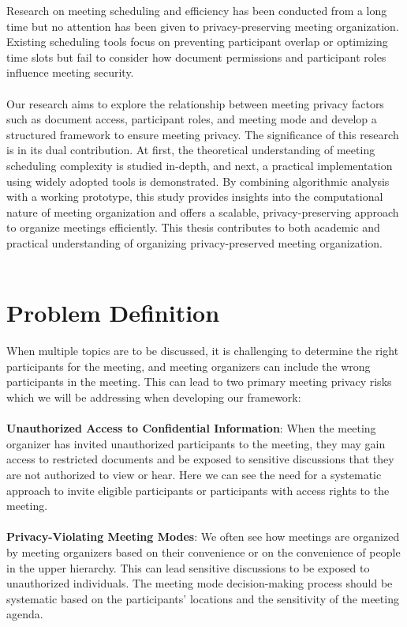 Research on meeting scheduling and efficiency has been conducted from a long time but no attention has been given to privacy-preserving meeting organization. Existing scheduling tools focus on preventing participant overlap or optimizing time slots but fail to consider how document permissions and participant roles influence meeting security.\\ \\
Our research aims to explore the relationship between meeting privacy factors such as document access, participant roles, and meeting mode and develop a structured framework to ensure meeting privacy.
The significance of this research is in its dual contribution. At first, the theoretical understanding of meeting scheduling complexity is studied in-depth, and next, a practical implementation using widely adopted tools is demonstrated. By combining algorithmic analysis with a working prototype, this study provides insights into the computational nature of meeting organization and offers a scalable, privacy-preserving approach to organize meetings efficiently. This thesis contributes to both academic and practical understanding of organizing privacy-preserved meeting organization.\\ \\

\section{Problem Definition}
When multiple topics are to be discussed, it is challenging to determine the right participants for the meeting, and meeting organizers can include the wrong participants in the meeting. This can lead to two primary meeting privacy risks which we will be addressing when developing our framework:
\\
\\
\textbf{Unauthorized Access to Confidential Information}: When the meeting organizer has invited unauthorized participants to the meeting, they may gain access to restricted documents and be exposed to sensitive discussions that they are not authorized to view or hear. Here we can see the need for a systematic approach to invite eligible participants or participants with access rights to the meeting.
\\
\\
\textbf{Privacy-Violating Meeting Modes}: We often see how meetings are organized by meeting organizers based on their convenience or on the convenience of people in the upper hierarchy. This can lead sensitive discussions to be exposed to unauthorized individuals. The meeting mode decision-making process should be systematic based on the participants’ locations and the sensitivity of the meeting agenda. 

